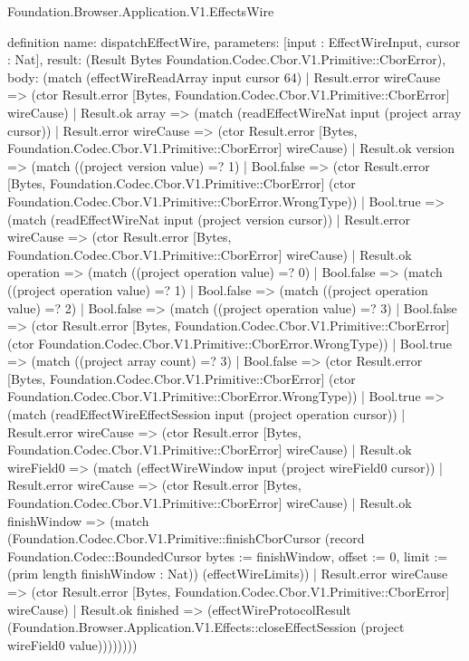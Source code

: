 \begin{lexlean}{Foundation.Browser.Application.V1.EffectsWire}
\begin{semanticmodule}
definition{
  name: dispatchEffectWire,
  parameters: [input : EffectWireInput, cursor : Nat],
  result: (Result Bytes Foundation.Codec.Cbor.V1.Primitive::CborError),
  body: (match (effectWireReadArray input cursor 64)
    | Result.error wireCause => (ctor Result.error [Bytes, Foundation.Codec.Cbor.V1.Primitive::CborError] wireCause)
    | Result.ok array => (match (readEffectWireNat input (project array cursor))
      | Result.error wireCause => (ctor Result.error [Bytes, Foundation.Codec.Cbor.V1.Primitive::CborError] wireCause)
      | Result.ok version => (match ((project version value) =? 1)
        | Bool.false => (ctor Result.error [Bytes, Foundation.Codec.Cbor.V1.Primitive::CborError] (ctor Foundation.Codec.Cbor.V1.Primitive::CborError.WrongType))
        | Bool.true => (match (readEffectWireNat input (project version cursor))
          | Result.error wireCause => (ctor Result.error [Bytes, Foundation.Codec.Cbor.V1.Primitive::CborError] wireCause)
          | Result.ok operation => (match ((project operation value) =? 0)
            | Bool.false => (match ((project operation value) =? 1)
              | Bool.false => (match ((project operation value) =? 2)
                | Bool.false => (match ((project operation value) =? 3)
                  | Bool.false => (ctor Result.error [Bytes, Foundation.Codec.Cbor.V1.Primitive::CborError] (ctor Foundation.Codec.Cbor.V1.Primitive::CborError.WrongType))
                  | Bool.true => (match ((project array count) =? 3)
                    | Bool.false => (ctor Result.error [Bytes, Foundation.Codec.Cbor.V1.Primitive::CborError] (ctor Foundation.Codec.Cbor.V1.Primitive::CborError.WrongType))
                    | Bool.true => (match (readEffectWireEffectSession input (project operation cursor))
                      | Result.error wireCause => (ctor Result.error [Bytes, Foundation.Codec.Cbor.V1.Primitive::CborError] wireCause)
                      | Result.ok wireField0 => (match (effectWireWindow input (project wireField0 cursor))
                        | Result.error wireCause => (ctor Result.error [Bytes, Foundation.Codec.Cbor.V1.Primitive::CborError] wireCause)
                        | Result.ok finishWindow => (match (Foundation.Codec.Cbor.V1.Primitive::finishCborCursor (record Foundation.Codec::BoundedCursor {bytes := finishWindow, offset := 0, limit := (prim length finishWindow : Nat)}) (effectWireLimits))
                          | Result.error wireCause => (ctor Result.error [Bytes, Foundation.Codec.Cbor.V1.Primitive::CborError] wireCause)
                          | Result.ok finished => (effectWireProtocolResult (Foundation.Browser.Application.V1.Effects::closeEffectSession (project wireField0 value))))))))
}
\end{semanticmodule}
\end{lexlean}
